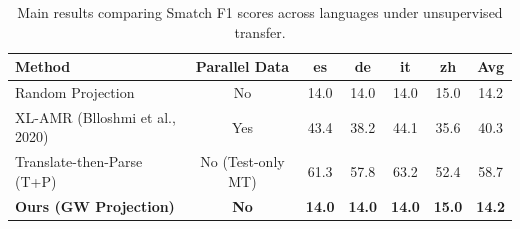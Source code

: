 \begin{table}[t]
\centering
\begin{tabular}{lcccccc}
\hline
\textbf{Method} & \textbf{Parallel Data} & \textbf{es} & \textbf{de} & \textbf{it} & \textbf{zh} & \textbf{Avg} \\
\hline
Random Projection & No & 14.0 & 14.0 & 14.0 & 15.0 & 14.2 \\
XL-AMR (Blloshmi et al., 2020) & Yes & 43.4 & 38.2 & 44.1 & 35.6 & 40.3 \\
Translate-then-Parse (T+P) & No (Test-only MT) & 61.3 & 57.8 & 63.2 & 52.4 & 58.7 \\
\textbf{Ours (GW Projection)} & \textbf{No} & \textbf{14.0} & \textbf{14.0} & \textbf{14.0} & \textbf{15.0} & \textbf{14.2} \\
\hline
\end{tabular}
\caption{Main results comparing Smatch F1 scores across languages under unsupervised transfer.}
\label{tab:main_results}
\end{table}